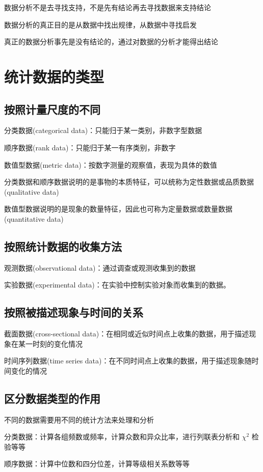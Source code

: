 \documentclass[UTF8,10pt]{book}
\begin{document}
    数据分析不是去寻找支持，不是先有结论再去寻找数据来支持结论

    数据分析的真正目的是从数据中找出规律，从数据中寻找启发

    真正的数据分析事先是没有结论的，通过对数据的分析才能得出结论
    \section{统计数据的类型}
    \subsection{按照计量尺度的不同}
    分类数据(categorical data)：只能归于某一类别，非数字型数据

    顺序数据(rank data)：只能归于某一有序类别，非数字

    数值型数据(metric data)：按数字测量的观察值，表现为具体的数值

    分类数据和顺序数据说明的是事物的本质特征，可以统称为定性数据或品质数据(qualitative data)

    数值型数据说明的是现象的数量特征，因此也可称为定量数据或数量数据(quantitative data)

    \subsection{按照统计数据的收集方法}
    观测数据(observational data)：通过调查或观测收集到的数据

    实验数据(experimental data)：在实验中控制实验对象而收集到的数据。

    \subsection{按照被描述现象与时间的关系}
    截面数据(cross-sectional data)：在相同或近似时间点上收集的数据，用于描述现象在某一时刻的变化情况

    时间序列数据(time series data)：在不同时间点上收集的数据，用于描述现象随时间变化的情况

    \subsection{区分数据类型的作用}
    不同的数据需要用不同的统计方法来处理和分析

    分类数据：计算各组频数或频率，计算众数和异众比率，进行列联表分析和 $\chi^2$ 检验等等

    顺序数据：计算中位数和四分位差，计算等级相关系数等等
\end{document}
